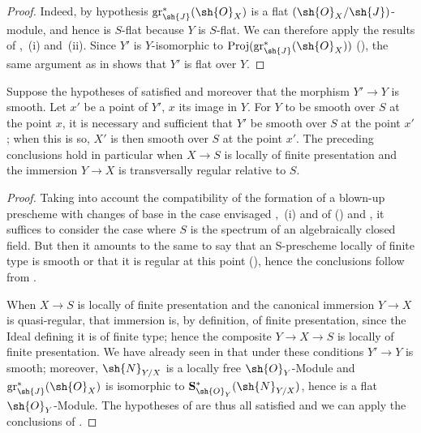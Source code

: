 \begin{proof}
Indeed, by hypothesis $\operatorname{gr}_\sh{J}^*(\sh{O}_X)$ is a flat $(\sh{O}_X/\sh{J})$-module, and hence is $S$-flat because $Y$ is $S$-flat.
We can therefore apply the results of ,~(i) and~(ii).
Since $Y'$ is $Y$-isomorphic to $\operatorname{Proj}(\operatorname{gr}_\sh{J}^*(\sh{O}_X))$ (), the same argument as in  shows that $Y'$ is flat over $Y$.
\end{proof}

\begin{proposition}[19.4.8]
\label{IV.19.4.8}
Suppose the hypotheses of  satisfied and moreover that the morphism $Y'\to Y$ is smooth.
Let $x'$ be a point of $Y'$, $x$ its image in $Y$.
For $Y$ to be smooth over $S$ at the point $x$, it is necessary and sufficient that $Y'$ be smooth over $S$ at the point $x'$; when this is so, $X'$ is then smooth over $S$ at the point $x'$.
The preceding conclusions hold in particular when $X\to S$ is locally of finite presentation and the immersion $Y\to X$ is transversally regular relative to $S$.
\end{proposition}

\begin{proof}
Taking into account the compatibility of the formation of a blown-up prescheme with changes of base in the case envisaged ,~(i) and of () and ,
it suffices to consider the case where $S$ is the spectrum of an algebraically closed field.
But then it amounts to the same to say that an S-prescheme locally of finite type is smooth or that it is regular at this point (), hence the conclusions follow from .

When $X\to S$ is locally of finite presentation and the canonical immersion $Y\to X$ is quasi-regular, that immersion is, by definition, of finite presentation, since the Ideal defining it is of finite type; hence the composite $Y\to X\to S$ is locally of finite presentation.
We have already seen in  that under these conditions $Y'\to Y$ is smooth; moreover, $\sh{N}_{Y/X}$ is a locally free $\sh{O}_Y$-Module and $\operatorname{gr}_\sh{J}^*(\sh{O}_X)$ is isomorphic to $\mathbf{S}^*_{\sh{O}_Y}(\sh{N}_{Y/X})$, hence is a flat $\sh{O}_Y$-Module.
The hypotheses of  are thus all satisfied and we can apply the conclusions of .
\end{proof}

